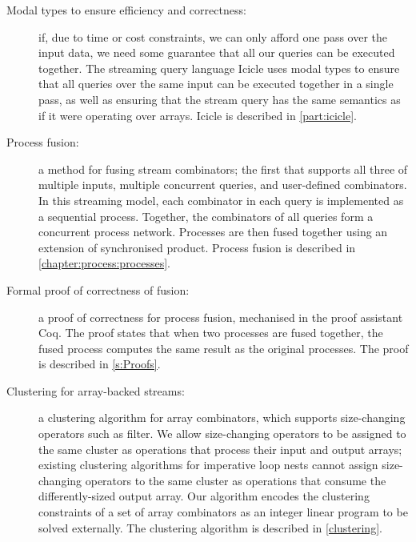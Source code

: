 \begin{description}
\item[Modal types to ensure efficiency and correctness:]
if, due to time or cost constraints, we can only afford one pass over the input data, we need some guarantee that all our queries can be executed together.
The streaming query language Icicle uses modal types to ensure that all queries over the same input can be executed together in a single pass, as well as ensuring that the stream query has the same semantics as if it were operating over arrays.
Icicle is described in \cref{part:icicle}.


\item[Process fusion:]
a method for fusing stream combinators; the first that supports all three of multiple inputs, multiple concurrent queries, and user-defined combinators.
In this streaming model, each combinator in each query is implemented as a sequential process.
Together, the combinators of all queries form a concurrent process network.
Processes are then fused together using an extension of synchronised product.
Process fusion is described in \cref{chapter:process:processes}.

\item[Formal proof of correctness of fusion:]
a proof of correctness for process fusion, mechanised in the proof assistant Coq.
The proof states that when two processes are fused together, the fused process computes the same result as the original processes.
The proof is described in \cref{s:Proofs}.

\item[Clustering for array-backed streams:]
a clustering algorithm for array combinators, which supports size-changing operators such as filter.
We allow size-changing operators to be assigned to the same cluster as operations that process their input and output arrays; existing clustering algorithms for imperative loop nests cannot assign size-changing operators to the same cluster as operations that consume the differently-sized output array.
Our algorithm encodes the clustering constraints of a set of array combinators as an integer linear program to be solved externally.
The clustering algorithm is described in \cref{clustering}.

\end{description}

